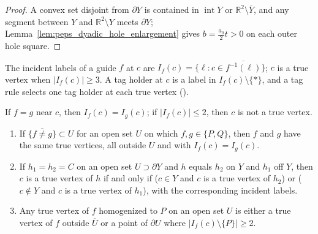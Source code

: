 \begin{proof}\leanok
    A convex set disjoint from $\partial Y$ is contained in $\operatorname{int}Y$
    or $\mathbb R^2\setminus\overline Y$, and any segment between $Y$ and
    $\mathbb R^2\setminus Y$ meets $\partial Y$; Lemma~\ref{lem:peps_dyadic_hole_enlargement}
    gives $b=\tfrac{a_0}2t>0$ on each outer hole square.
\end{proof}

\begin{definition}
    \label{def:peps_dyadic_incident_labels}
    \leanok
    The incident labels of a guide $f$ at $c$ are
    $I_f(c)=\{\ell:c\in\overline{f^{-1}(\ell)}\}$; $c$ is a true vertex when
    $|I_f(c)|\ge3$. A tag holder at $c$ is a label in $I_f(c)\setminus\{\ast\}$,
    and a tag rule selects one tag holder at each true vertex
    (\cite[Section~7, lines 109--125]{OpenAI2026PolynomialPEPS}).
\end{definition}

\begin{lemma}
    \label{lem:peps_dyadic_incident_change}
    \leanok
    If $f=g$ near $c$, then $I_f(c)=I_g(c)$; if $|I_f(c)|\le2$, then $c$ is not a
    true vertex.
    \begin{enumerate}
        \item If $\overline{\{f\ne g\}}\subset U$ for an open set $U$ on which
              $f,g\in\{P,Q\}$, then $f$ and $g$ have the same true vertices, all
              outside $U$ and with $I_f(c)=I_g(c)$.
        \item If $h_1=h_2=C$ on an open set $U\supset\partial Y$ and $h$ equals
              $h_2$ on $Y$ and $h_1$ off $Y$, then $c$ is a true vertex of $h$ if
              and only if ($c\in Y$ and $c$ is a true vertex of $h_2$) or
              ($c\notin Y$ and $c$ is a true vertex of $h_1$), with the
              corresponding incident labels.
        \item Any true vertex of $f$ homogenized to $P$ on an open set $U$ is
              either a true vertex of $f$ outside $\overline U$ or a point of
              $\partial U$ where $|I_f(c)\setminus\{P\}|\ge2$.
    \end{enumerate}
\end{lemma}

